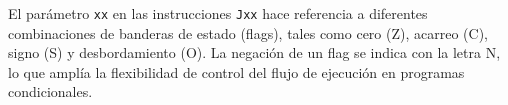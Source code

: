 \documentclass[12pt,oneside]{templates/unerthesis}
\begin{document}
\begin{table}[!h]
\centering
\caption{\label{tab:setreducido}Tabla de instrucciones de VonSim8}
\centering
{}
\end{table}

El parámetro \texttt{xx} en las instrucciones \texttt{Jxx} hace referencia a diferentes combinaciones de banderas de estado (flags), tales como cero (Z), acarreo (C), signo (S) y desbordamiento (O). La negación de un flag se indica con la letra N, lo que amplía la flexibilidad de control del flujo de ejecución en programas condicionales.
\end{document}
